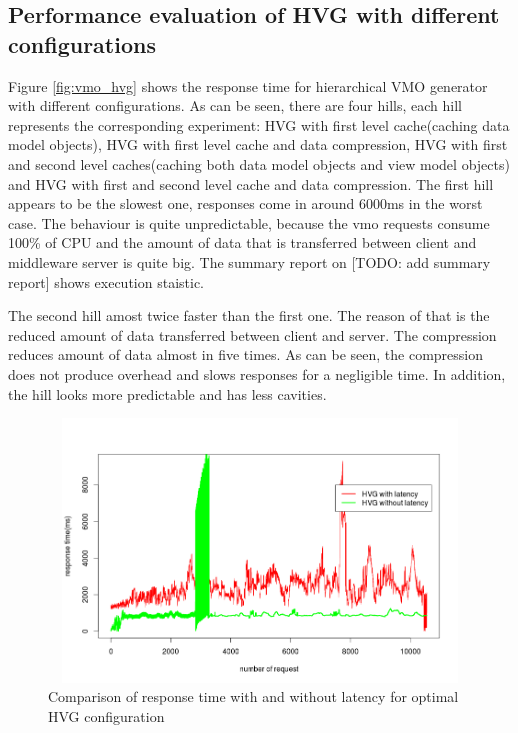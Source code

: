 \subsection{Performance evaluation of HVG with different configurations}

Figure \ref{fig:vmo_hvg} shows the response time for hierarchical VMO generator with different configurations. As can be seen, there are four hills, each hill represents the corresponding experiment: HVG with first level cache(caching data model objects), HVG with first level cache and data compression, HVG with first and second level caches(caching both data model objects and view model objects) and HVG with first and second level cache and data compression. The first hill appears to be the slowest one, responses come in around 6000ms in the worst case. The behaviour is quite unpredictable, because the vmo requests consume 100\% of CPU and the amount of data that is transferred between client and middleware server is quite big. The summary report on [TODO: add summary report] shows execution staistic.

The second hill amost twice faster than the first one. The reason of that is the reduced amount of data transferred between client and server. The compression reduces amount of data almost in five times. As can be seen, the compression does not produce overhead and slows responses for a negligible time. In addition, the hill looks more predictable and has less cavities.  


\begin{figure}[h!]
    \centering
    \includegraphics[width=15cm,height=7cm,keepaspectratio]{images/hvg_latency_comparison.png}
    \caption{Comparison of response time with and without latency for optimal HVG configuration}
    \label{fig:hvg_comparison}
\end{figure}


